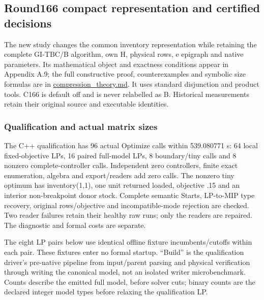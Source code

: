 \documentclass[
  american,
  11pt,
]{article}
\begin{document}
\begin{landscape}
\end{landscape}

\begin{landscape}

\subsection{Round166 compact representation and certified
decisions}\label{round166-compact-representation-and-certified-decisions}

The new study changes the common inventory representation while
retaining the complete GI-TBC/B algorithm, own H, physical rows, e
epigraph and native parameters. Its mathematical object and exactness
conditions appear in Appendix A.9; the full constructive proof,
counterexamples and symbolic size formulas are in
\href{https://github.com/yifanXovo/TailoredExact/blob/codex/round172-journal-manuscript/results/unified_exact_round166/compression_theory.md}{compression\_\allowbreak{}theory.md}.
It uses standard disjunction and product tools. C166 is default off and
is never relabelled as B. Historical measurements retain their original
source and executable identities.

\subsubsection{Qualification and actual matrix
sizes}\label{qualification-and-actual-matrix-sizes}

The C++ qualification has 96 actual Optimize calls within 539.080771 s:
64 local fixed-objective LPs, 16 paired full-model LPs, 8 boundary/tiny
calls and 8 nonzero complete-controller calls. Independent zero
controllers, finite exact enumeration, algebra and export/readers add
zero calls. The nonzero tiny optimum has inventory(1,1), one unit
returned loaded, objective .15 and an interior non-breakpoint donor
stock. Complete semantic Starts, LP-to-MIP type recovery, original
rows/objective and incompatible-mode rejection are checked. Two reader
failures retain their healthy raw runs; only the readers are repaired.
The diagnostic and formal costs are separate.

The eight LP pairs below use identical offline fixture
incumbents/cutoffs within each pair. These fixtures enter no formal
startup. ``Build'' is the qualification driver's pre-native pipeline
from input/parent parsing and physical verification through writing the
canonical model, not an isolated writer microbenchmark. Counts describe
the emitted full model, before solver cuts; binary counts are the
declared integer model types before relaxing the qualification LP.


\end{landscape}
\end{document}
